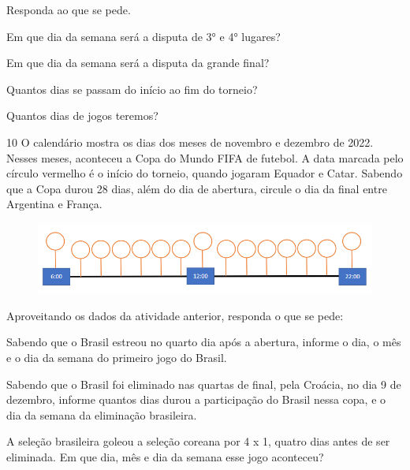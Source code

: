 Responda ao que se pede.

\begin{escolha}
\item Em que dia da semana será a disputa de 3° e 4° lugares?


\item Em que dia da semana será a disputa da grande final?


\item Quantos dias se passam do início ao fim do torneio?


\item Quantos dias de jogos teremos?

\end{escolha}

\pagebreak
\num{10} O calendário mostra os dias dos meses de novembro e dezembro de
2022. Nesses meses, aconteceu a Copa do Mundo FIFA de futebol. A data
marcada pelo círculo vermelho é o início do torneio, quando jogaram
Equador e Catar. Sabendo que a Copa durou 28 dias, além do dia de abertura, circule o dia da
final entre Argentina e França.


\begin{figure}[htpb!]
\includegraphics[width=\textwidth]{./media/image59.png}
\end{figure}

Aproveitando os dados da atividade anterior, responda o que se pede:

\begin{escolha}
\item Sabendo que o Brasil estreou no quarto dia após a abertura, informe o dia, o
  mês e o dia da semana do primeiro jogo do Brasil.


\item Sabendo que o Brasil foi eliminado nas quartas de final, pela Croácia,
  no dia 9 de dezembro, informe quantos dias durou a participação do
  Brasil nessa copa, e o dia da semana da eliminação brasileira.


\item A seleção brasileira goleou a seleção coreana por 4 x 1, quatro dias
  antes de ser eliminada. Em que dia, mês e dia da semana esse jogo
  aconteceu?

\end{escolha}

